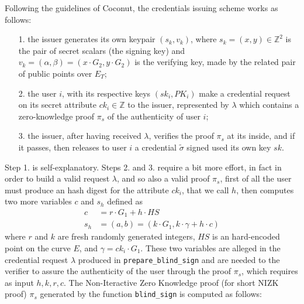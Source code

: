 \documentclass[twocolumn]{article}
\begin{document}
Following the guidelines of Coconut, the credentials issuing scheme works as follows:
\begin{itemize}
\item [1.] the issuer generates its own keypair $(s_k,v_k)$, where $s_k=(x,y)\in\mathbb{Z}^2$ is the pair of secret scalars (the signing key) and $v_k=(\alpha, \beta)=(x\cdot G_2,y\cdot G_2)$ is the verifying key, made by the related pair of public points over $E_T$; 
\item [2.] the user $i$, with its respective keys $(sk_i, PK_i)$ make a credential request on its secret attribute $ck_i\in\mathbb{Z}$ to the issuer, represented by $\lambda$ which contains a zero-knowledge proof $\pi_s$ of the authenticity of user $i$; 
\item[3.] the issuer, after having received $\lambda$, verifies the proof $\pi_s$ at its inside, and if it passes, then releases to user $i$ a credential $\tilde{\sigma}$ signed used its own key $sk$.
\end{itemize}
Step 1. is self-explanatory. Steps 2. and 3. require a bit more effort, in fact in order to build a valid request $\lambda$, and so also a valid proof $\pi_s$, first of all the user must produce an hash digest for the attribute $ck_i$, that we call $h$, then computes two more variables $c$ and $s_h$ defined as
\begin{align*}
c &= r\cdot G_1 + h\cdot HS \\
s_h &= (a,b) = (k \cdot G_1, k\cdot \gamma + h\cdot c)
\end{align*}
where $r$ and $k$ are fresh randomly generated integers, $HS$ is an hard-encoded point on the curve $E$, and $\gamma = ck_i\cdot G_1$. These two variables are alleged in the credential request $\lambda$ produced in \verb!prepare_blind_sign! and are needed to the verifier to assure the authenticity of the user through the proof $\pi_s$, which requires as input $h, k, r, c$. The Non-Iteractive Zero Knowledge proof (for short NIZK proof) $\pi_s$ generated by the function \verb!blind_sign! is computed as follows:
\end{document}
